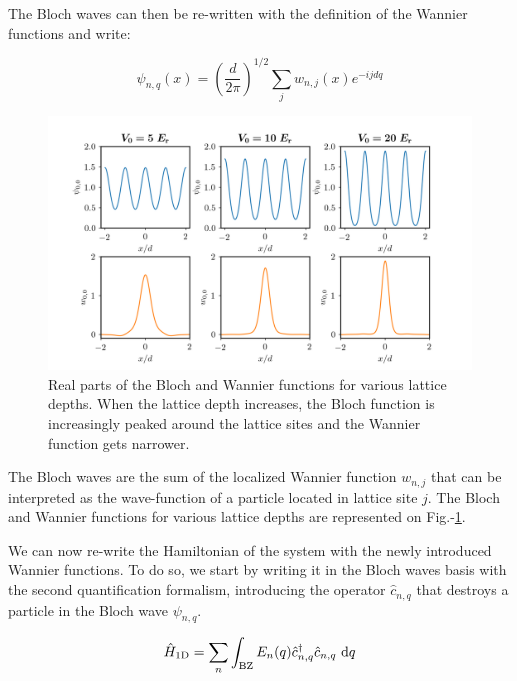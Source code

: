 The Bloch waves can then be re-written with the definition of the Wannier functions and write:

\begin{equation}
    \psi_{n, q}(x)=\left(\frac{d}{2 \pi}\right)^{1 / 2} \sum_{j} w_{n, j}(x) e^{-i j d q}
    \label{eq:bloch_as_wannier}
\end{equation}


\begin{figure}
    \centering
    \includegraphics[width=1.05\textwidth]{Fig/Chapter2/bloch_wannier.png}
    \caption[Real parts of the Bloch and Wannier functions for various lattice depths]{Real parts of the Bloch and Wannier functions for various lattice depths. When the lattice depth increases, the Bloch function is increasingly peaked around the lattice sites and the Wannier function gets narrower.}
    \label{fig:bloch_wannier}
\end{figure}

\noindent The Bloch waves are the sum of the localized Wannier function $w_{n, j}$ that can be interpreted as the wave-function of a particle located in lattice site $j$. The Bloch and Wannier functions for various lattice depths are represented on Fig.-\ref{fig:bloch_wannier}.

We can now re-write the Hamiltonian of the system with the newly introduced Wannier functions. To do so, we start by writing it in the Bloch waves basis with the second quantification formalism, introducing the operator $\hat{c}_{n,q}$ that destroys a particle in the Bloch wave $\psi_{n,q}$.

\begin{equation}
    \hat{H}_{\rm{1D}}=\sum_{n} \int_{\mathrm{BZ}} E_{n}(q) \hat{c}_{n, q}^{\dagger} \hat{c}_{n, q} \mathrm{~d} q
    \label{eq:H_bloch}
\end{equation}

